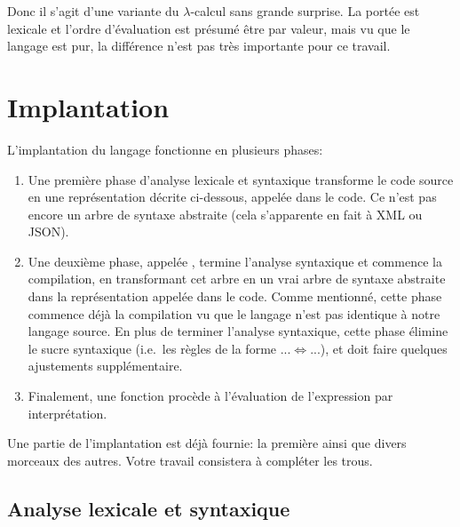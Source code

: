 \documentclass{article}
\begin{document}
Donc il s'agit d'une variante du $\lambda$-calcul sans grande surprise.
La portée est lexicale et l'ordre d'évaluation est présumé être par
valeur, mais vu que le langage est pur, la différence n'est pas très
importante pour ce travail.

\section{Implantation}

L'implantation du langage fonctionne en plusieurs phases:
\begin{enumerate}
\item Une première phase d'analyse lexicale et syntaxique transforme le code
  source en une représentation décrite ci-dessous, appelée  dans le
  code.  Ce n'est pas encore un arbre de syntaxe abstraite (cela
  s'apparente en fait à XML ou JSON).
\item Une deuxième phase, appelée , termine l'analyse syntaxique et
  commence la compilation, en transformant cet arbre en un vrai arbre de
  syntaxe abstraite dans la représentation appelée  dans le code.
  Comme mentionné, cette phase commence déjà la compilation vu que le
  langage  n'est pas identique à notre langage source.  En plus de
  terminer l'analyse syntaxique, cette phase élimine le sucre syntaxique
  (i.e.~les règles de la forme $...\Longleftrightarrow...$), et doit faire
  quelques ajustements supplémentaire.
\item Finalement, une fonction  procède à l'évaluation de
  l'expression par interprétation.
\end{enumerate}
Une partie de l'implantation est déjà fournie: la première ainsi que divers
morceaux des autres.  Votre travail consistera à compléter les trous.

\subsection{Analyse lexicale et syntaxique}
\end{document}
